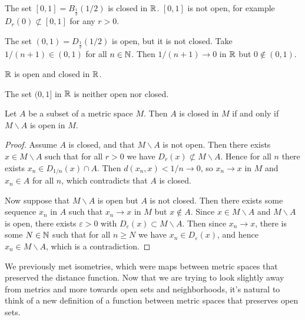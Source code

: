 \documentclass[a4paper]{scrartcl}
\begin{document}
\begin{example}
    The set $[0, 1] = B_{\frac{1}{2}}(1/2)$ is closed in $\mathbb{R}$. $[0, 1]$ is not open, for example $D_r(0) \not \subset [0, 1]$ for any $r > 0$.

    The set $(0, 1) = D_{\frac{1}{2}}(1/2)$ is open, but it is not closed. Take $1/(n + 1) \in (0, 1)$ for all $n \in \mathbb{N}$. Then $1/(n + 1) \rightarrow 0$ in $\mathbb{R}$ but $0 \not \in (0, 1)$.
\end{example}

\begin{example}
   $\mathbb{R}$ is open and closed in $\mathbb{R}$.
\end{example}

\begin{example}
    The set $(0, 1]$ in $\mathbb{R}$ is neither open nor closed.
\end{example}

\begin{lemma}
    Let $A$ be a subset of a metric space $M$. Then $A$ is closed in $M$ if and only if $M \backslash A$ is open in $M$.
\end{lemma}
\begin{proof}
    Assume $A$ is closed, and that $M \backslash A$ is not open. Then there exists $x \in M \backslash A$ such that for all $r > 0$ we have $D_r(x) \not \subset M\backslash A$. 
    Hence for all $n$ there exists $x_n \in D_{1/n}(x) \cap A$. Then $d(x_n, x) < 1/n \rightarrow 0$, so $x_n \rightarrow x$ in $M$ and $x_n \in A$ for all $n$, which contradicts that $A$ is closed.

    Now suppose that $M \backslash A$ is open but $A$ is not closed. Then there exists some sequence $x_n$ in $A$ such that $x_n \rightarrow x$ in $M$ but $x \not \in A$. Since $x \in M \backslash A$ and $M \backslash A$ is open, there exists $\varepsilon > 0$ with $D_\varepsilon(x) \subset M \backslash A$. Then since $x_n \rightarrow x$, there is some $N \in \mathbb{N}$ such that for all $n \geq N$ we have $x_n \in D_{\varepsilon}(x)$, and hence $x_n \in M \backslash A$, which is a contradiction.
\end{proof}

We previously met isometries, which were maps between metric spaces that preserved the distance function. Now that we are trying to look slightly away from metrics and more towards open sets and neighborhoods, it's natural to think of a new definition of a function between metric spaces that preserves open sets.
\end{document}
